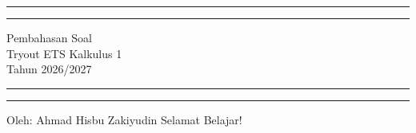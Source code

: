 \documentclass[10pt,openany,a4paper]{article}
\theoremstyle{definition}
\theoremstyle{definition}
\theoremstyle{plain}
\begin{document}
\begin{titlepage}
	\centering %
	\vspace*{1.5\baselineskip} %

	\rule{13cm}{1.6pt}\vspace*{-\baselineskip}\vspace*{2pt} %
	\rule{13cm}{0.4pt} %
	
		\vspace{0.75\baselineskip} %
	{	\Huge Pembahasan Soal\\ 
			\vspace{4mm}
		Tryout ETS Kalkulus 1 \\ \vspace{2mm} \huge{Tahun 2026/2027}\\	}
		\vspace{0.75\baselineskip} %
	\rule{13cm}{0.4pt}\vspace*{-\baselineskip}\vspace{3.2pt} %
	\rule{13cm}{1.6pt} %
	
		\vspace{1.75\baselineskip} %
{\large Oleh: Ahmad Hisbu Zakiyudin}
	\vfill
	\vspace{1mm}
\huge{Selamat Belajar!}
\end{titlepage}
\makeatletter
\setlength\fboxsep{3pt}
\setlength{\headheight}{24pt}
\end{document}
